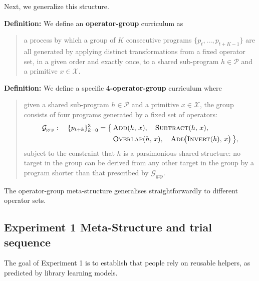 \documentclass{article}
\begin{document}
Next, we generalize this structure.

\textbf{Definition:}
We define an \textbf{operator-group} curriculum as
\begin{quote}
a process by which a group of $K$ consecutive programs $\{p_{t}, \ldots, p_{t+K-1}\}$ are all generated by applying distinct transformations from a fixed operator set, in a given order and exactly once, to a shared sub-program $h \in \mathcal{P}$ and a primitive $x \in \mathcal{X}$.
\end{quote}

\textbf{Definition:}
We define a specific \textbf{4-operator-group} curriculum where
\begin{quote}
given a shared sub-program $h \in \mathcal{P}$ and a primitive $x \in \mathcal{X}$, the group consists of four programs generated by a fixed set of operators:
\begin{equation}
\begin{split}
    \mathcal{G}_{\mathrm{grp}}: \quad \{p_{t+k}\}_{k=0}^{3} = \bigl\{\,
        &\textsc{Add}(h,\, x),\quad
        \textsc{Subtract}(h,\, x),\\
        &\textsc{Overlap}(h,\, x),\quad
        \textsc{Add}\!\bigl(\textsc{Invert}(h),\, x\bigr)
    \,\bigr\},
\end{split}
\end{equation}
subject to the constraint that $h$ is a parsimonious shared structure: no target in the group can be derived from any other target in the group by a program shorter than that prescribed by $\mathcal{G}_{\mathrm{grp}}$.
\end{quote}

The operator-group meta-structure generalises straightforwardly to different operator sets. 

\subsection{Experiment 1 Meta-Structure and trial sequence}

The goal of Experiment 1 is to establish that people rely on reusable helpers, as predicted by library learning models.
\end{document}

